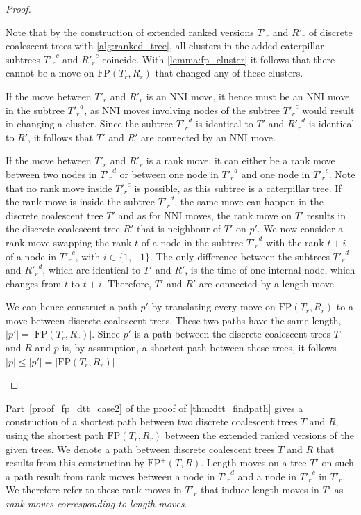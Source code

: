 \documentclass[11pt]{amsart}
\newcommand{\nni}{\mathrm{NNI}}
\newcommand{\fp}{\mathrm{FP}}
\begin{document}
\begin{proof}
\begin{enumerate}
		Note that by the construction of extended ranked versions $T'_r$ and $R'_r$ of discrete coalescent trees with \autoref{alg:ranked_tree}, all clusters in the added caterpillar subtrees ${T'_r}^c$ and ${R'_r}^c$ coincide.
		With \autoref{lemma:fp_cluster} it follows that there cannot be a move on $\fp(T_r,R_r)$ that changed any of these clusters.

		If the move between $T'_r$ and $R'_r$ is an $\nni$ move, it hence must be an $\nni$ move in the subtree ${T'_r}^d$, as $\nni$ moves involving nodes of the subtree ${T'_r}^c$ would result in changing a cluster.
		Since the subtree ${T'_r}^d$ is identical to $T'$ and ${R'_r}^d$ is identical to $R'$, it follows that $T'$ and $R'$ are connected by an $\nni$ move.

		If the move between $T'_r$ and $R'_r$ is a rank move, it can either be a rank move between two nodes in ${T'_r}^d$ or between one node in ${T'_r}^d$ and one node in ${T'_r}^c$.
		Note that no rank move inside ${T'_r}^c$ is possible, as this subtree is a caterpillar tree.
		If the rank move is inside the subtree ${T'_r}^d$, the same move can happen in the discrete coalescent tree $T'$ and as for $\nni$ moves, the rank move on $T'$ results in the discrete coalescent tree $R'$ that is neighbour of $T'$ on $p'$.
		We now consider a rank move swapping the rank $t$ of a node in the subtree ${T'_r}^d$ with the rank $t+i$ of a node in ${T'_r}^c$, with $i \in \{1,-1\}$.
		The only difference between the subtrees ${T'_r}^d$ and ${R'_r}^d$, which are identical to $T'$ and $R'$, is the time of one internal node, which changes from $t$ to $t+i$.
		Therefore, $T'$ and $R'$ are connected by a length move.

		We can hence construct a path $p'$ by translating every move on $\fp(T_r,R_r)$ to a move between discrete coalescent trees.
		These two paths have the same length, $|p'| = |\fp(T_r,R_r)|$.
		Since $p'$ is a path between the discrete coalescent trees $T$ and $R$ and $p$ is, by assumption, a shortest path between these trees, it follows $|p| \leq |p'| = |\fp(T_r,R_r)|$
	\end{enumerate}
\end{proof}

Part~\ref{proof_fp_dtt_case2} of the proof of \autoref{thm:dtt_findpath} gives a construction of a shortest path between two discrete coalescent trees $T$ and $R$, using the shortest path $\fp(T_r,R_r)$ between the extended ranked versions of the given trees.
We denote a path between discrete coalescent trees $T$ and $R$ that results from this construction by $\fp^+(T,R)$.
Length moves on a tree $T'$ on such a path result from rank moves between a node in ${T'_r}^d$ and a node in ${T'_r}^c$ in $T'_r$.
We therefore refer to these rank moves in $T'_r$ that induce length moves in $T'$ as \emph{rank moves corresponding to length moves}.
\end{document}
